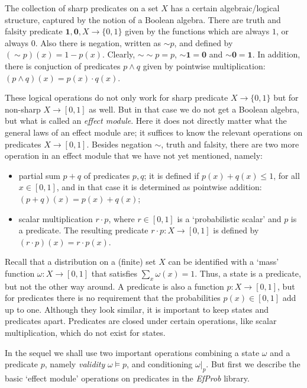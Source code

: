 \documentclass[leqno]{tufte-book} %
\newcommand{\EfProb}{\textit{EfProb}\xspace}
\newcommand{\one}{\ensuremath{\mathbf{1}}}
\newcommand{\zero}{\ensuremath{\mathbf{0}}}
\newcommand{\ortho}{\mathop{\sim}}
\begin{document}
The collection of sharp predicates on a set $X$ has a certain
algebraic/logical structure, captured by the notion of a Boolean
algebra. There are truth and falsity predicate $\one, \zero, X
\rightarrow \{0,1\}$ given by the functions which are always $1$, or
always $0$. Also there is negation, written as $\ortho p$, and defined
by $(\ortho p)(x) = 1 - p(x)$. Clearly, $\ortho\ortho p = p$,
$\ortho\one = \zero$ and $\ortho\zero = \one$. In addition, there is
conjuction of predicates $p\wedge q$ given by pointwise
multiplication: $(p \wedge q)(x) = p(x) \cdot q(x)$.

These logical operations do not only work for sharp predicate $X
\rightarrow \{0,1\}$ but for non-sharp $X \rightarrow [0,1]$ as well.
But in that case we do not get a Boolean algebra, but what is called
an \emph{effect module}\cite{Jacobs15}. Here it
does not directly matter what the general laws of an effect module
are; it suffices to know the relevant operations on predicates $X
\rightarrow [0,1]$.  Besides negation $\ortho{}$, truth and falsity,
there are two more operation in an effect module that we have not yet
mentioned, namely:
\begin{itemize}
\item partial sum $p+q$ of predicates $p,q$; it is defined if $p(x) +
  q(x) \leq 1$, for all $x\in [0,1]$, and in that case it is determined
  as pointwise addition: $(p+q)(x) = p(x) + q(x)$;

\item scalar multiplication $r\cdot p$, where $r\in [0,1]$ is a
  `probabilistic scalar' and $p$ is a predicate. The resulting
  predicate $r\cdot p \colon X \rightarrow [0,1]$ is defined by
  $(r\cdot p)(x) = r\cdot p(x)$.
\end{itemize}

Recall that a distribution on a (finite) set $X$ can be identified
with a `mass' function $\omega \colon X \rightarrow [0,1]$ that
satisfies $\sum_{x}\omega(x) = 1$. Thus, a state is a predicate, but
not the other way around. A predicate is also a function $p\colon X
\rightarrow [0,1]$, but for predicates there is no requirement that
the probabilities $p(x) \in [0,1]$ add up to one. Although they look
similar, it is important to keep states and predicates apart.
Predicates are closed under certain operations, like scalar
multiplication, which do not exist for states.

In the sequel we shall use two important operations combining a state
$\omega$ and a predicate $p$, namely \emph{validity} $\omega\models
p$, and conditioning $\omega|_{p}$. But first we describe the basic
`effect module' operations on predicates in the \EfProb library.
\end{document}
